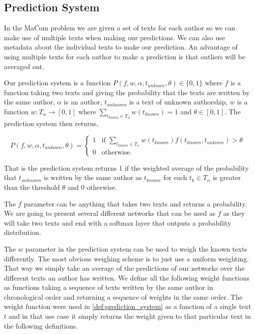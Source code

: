 \subsection{Prediction System}

In the MaCom problem we are given a set of texts for each author so we can make
use of multiple texts when making our predictions. We can also use metadata
about the individual texts to make our prediction. An advantage of using
multiple texts for each author to make a prediction is that outliers will be
averaged out.

\begin{definition}

    \label{def:prediction_system}

    Our prediction system is a function $P(f, w, \alpha, t_{unkown}, \theta)
    \in \{0, 1\}$ where $f$ is a function taking two texts and giving the
    probability that the texts are written by the same author, $\alpha$ is an
    author, $t_{unknown}$ is a text of unknown authorship, $w$ is a function
    $w:T_\alpha \rightarrow [0,1]$ where $\sum_{t_{known} \in T_\alpha}
    w(t_{known}) = 1$ and $\theta \in [0,1]$. The prediction system then
    returns,

    \begin{equation}
        P(f, w, \alpha, t_{unkown}, \theta) = \begin{cases}
            1 & \text{if } \sum_{t_{known} \in T_\alpha} w(t_{known}) f(t_{known}, t_{unkown}) > \theta \\
            0 & \text{otherwise}.
        \end{cases}
    \end{equation}

\end{definition}

That is the prediction system returns 1 if the weighted average of the
probability that $t_{unknown}$ is written by the same author as $t_{known}$ for
each $t_k \in T_\alpha$ is greater than the threshold $\theta$ and 0 otherwise.

The $f$ parameter can be anything that takes two texts and returns a
probability. We are going to present several different networks that can be used
as $f$ as they will take two texts and end with a softmax layer that outputs a
probability distribution.

The $w$ parameter in the prediction system can be used to weigh the known
texts differently. The most obvious weighing scheme is to just use a uniform
weighting. That way we simply take an average of the predictions of our networks
over the different texts an author has written. We define all the following
weight functions as functions taking a sequence of texts written by the same
author in chronological order and returning a sequence of weights in the same
order. The weight function were used in \ref{def:prediction_system} as a
function of a single text $t$ and in that use case it simply returns the weight
given to that particular text in the following definitions.

